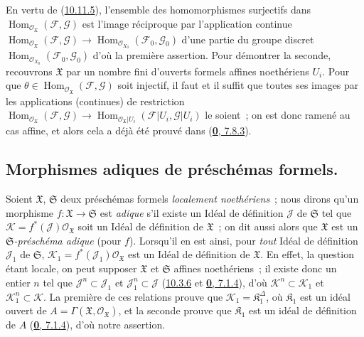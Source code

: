 En vertu de (\hyperref[I.10.11.5-fr]{10.11.5}), l'ensemble des
homomorphismes surjectifs dans
$\operatorname{Hom}_{\mathscr{O}_{\mathfrak{X}}}
(\mathscr{F},\mathscr{G})$ est l'image réciproque par l'application
continue
$\operatorname{Hom}_{\mathscr{O}_{\mathfrak{X}}}
(\mathscr{F},\mathscr{G})\to
\operatorname{Hom}_{\mathscr{O}_{X_0}}(\mathscr{F}_0,\mathscr{G}_0)$
d'une partie du groupe discret
$\operatorname{Hom}_{\mathscr{O}_{X_0}}(\mathscr{F}_0,\mathscr{G}_0)$
d'où la première assertion. Pour démontrer la seconde, recouvrons
$\mathfrak{X}$ par un nombre fini d'ouverts formels affines noethériens
$U_i$. Pour que
$\theta\in\operatorname{Hom}_{\mathscr{O}_{\mathfrak{X}}}
(\mathscr{F},\mathscr{G})$ soit injectif, il faut et il suffit que toutes
ses images par les applications (continues) de restriction
$\operatorname{Hom}_{\mathscr{O}_{\mathfrak{X}}}
(\mathscr{F},\mathscr{G})\to
\operatorname{Hom}_{\mathscr{O}_{\mathfrak{X}}|U_i}
(\mathscr{F}|U_i,\mathscr{G}|U_i)$ le soient~; on est donc ramené au cas
affine, et alors cela a déjà été prouvé dans
(\hyperref[0.7.8.3-fr]{\textbf{0}, 7.8.3}).


\subsection{Morphismes adiques de préschémas formels.}
\label{subsection:I.10.12-fr}

\begin{env}[10.12.1]
\label{I.10.12.1-fr}
Soient $\mathfrak{X}$, $\mathfrak{S}$ deux préschémas formels
\emph{localement noethériens}~; nous dirons qu'un morphisme
$f:\mathfrak{X}\to\mathfrak{S}$ est \emph{adique} s'il existe un Idéal
de définition $\mathscr{J}$ de $\mathfrak{S}$ tel que
$\mathscr{K}=f^*(\mathscr{J})\mathscr{O}_{\mathfrak{X}}$ soit un Idéal de
définition de $\mathfrak{X}$~; on dit aussi alors que $\mathfrak{X}$ est
un \emph{$\mathfrak{S}$-préschéma adique} (pour $f$). Lorsqu'il en est
ainsi, pour \emph{tout} Idéal de définition $\mathscr{J}_1$ de
$\mathfrak{S}$,
$\mathscr{K}_1=f^*(\mathscr{J}_1)\mathscr{O}_{\mathfrak{X}}$ est un Idéal
de définition de $\mathfrak{X}$. En effet, la question étant locale, on
peut supposer $\mathfrak{X}$ et $\mathfrak{S}$ affines noethériens~; il
existe donc un entier $n$ tel que $\mathscr{J}^n\subset\mathscr{J}_1$ et
$\mathscr{J}_1^n\subset\mathscr{J}$
(\hyperref[I.10.3.6-fr]{10.3.6} et
\hyperref[0.7.1.4-fr]{\textbf{0}, 7.1.4}), d'où
$\mathscr{K}^n\subset\mathscr{K}_1$ et
$\mathscr{K}_1^n\subset\mathscr{K}$. La première de ces relations prouve
que $\mathscr{K}_1=\mathfrak{K}_1^\Delta$, où $\mathfrak{K}_1$ est un
idéal ouvert de
$A=\Gamma(\mathfrak{X},\mathscr{O}_{\mathfrak{X}})$, et la seconde prouve
que $\mathfrak{K}_1$ est un idéal de définition de $A$
(\hyperref[0.7.1.4-fr]{\textbf{0}, 7.1.4}), d'où notre assertion.
\end{env}

